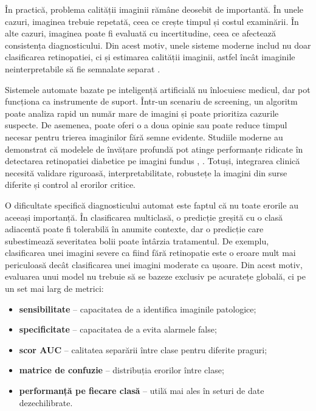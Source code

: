 \documentclass[12pt, a4paper, oneside, romanian]{teza-upb}
\begin{document}
În practică, problema calității imaginii rămâne deosebit de importantă. În unele cazuri, imaginea trebuie repetată, ceea ce crește timpul și costul examinării. În alte cazuri, imaginea poate fi evaluată cu incertitudine, ceea ce afectează consistența diagnosticului. Din acest motiv, unele sisteme moderne includ nu doar clasificarea retinopatiei, ci și estimarea calității imaginii, astfel încât imaginile neinterpretabile să fie semnalate separat \cite{14_liu2022deepdrid}.
\bigskip

Sistemele automate bazate pe inteligență artificială nu înlocuiesc medicul, dar pot funcționa ca instrumente de suport. Într-un scenariu de screening, un algoritm poate analiza rapid un număr mare de imagini și poate prioritiza cazurile suspecte. De asemenea, poate oferi o a doua opinie sau poate reduce timpul necesar pentru trierea imaginilor fără semne evidente. Studiile moderne au demonstrat că modelele de învățare profundă pot atinge performanțe ridicate în detectarea retinopatiei diabetice pe imagini fundus \cite{3_gulshan2016development}, \cite{15_li2019diagnostic}. Totuși, integrarea clinică necesită validare riguroasă, interpretabilitate, robustețe la imagini din surse diferite și control al erorilor critice.
\bigskip

O dificultate specifică diagnosticului automat este faptul că nu toate erorile au aceeași importanță. În clasificarea multiclasă, o predicție greșită cu o clasă adiacentă poate fi tolerabilă în anumite contexte, dar o predicție care subestimează severitatea bolii poate întârzia tratamentul. De exemplu, clasificarea unei imagini severe ca fiind fără retinopatie este o eroare mult mai periculoasă decât clasificarea unei imagini moderate ca ușoare. Din acest motiv, evaluarea unui model nu trebuie să se bazeze exclusiv pe acuratețe globală, ci pe un set mai larg de metrici:

\begin{itemize}
  \item \textbf{sensibilitate} -- capacitatea de a identifica imaginile patologice;
  \item \textbf{specificitate} -- capacitatea de a evita alarmele false;
  \item \textbf{scor AUC} -- calitatea separării între clase pentru diferite praguri;
  \item \textbf{matrice de confuzie} -- distribuția erorilor între clase;
  \item \textbf{performanță pe fiecare clasă} -- utilă mai ales în seturi de date dezechilibrate.
\end{itemize}
\end{document}
